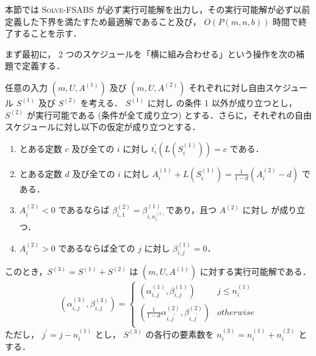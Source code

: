 本節では \textsc{Solve-FSABS} が必ず実行可能解を出力し，その実行可能解が必ず以前定義した下界を満たすため最適解であること及び， $O(P(m, n, b))$ 時間で終了することを示す．

まず最初に， 2 つのスケジュールを「横に組み合わせる」という操作を次の補題で定義する．

\begin{lemma}\label{lemma:horizontal-composition}
  任意の入力 $(m, U, A^{(1)})$ 及び $(m, U, A^{(2)})$ それぞれに対し自由スケジュール $S^{(1)}$ 及び $S^{(2)}$ を考える． $S^{(1)}$ に対し  の条件 1 以外が成り立つとし， $S^{(2)}$ が実行可能である (条件が全て成り立つ) とする．さらに，それぞれの自由スケジュールに対し以下の仮定が成り立つとする．
  \begin{enumerate}
  \item とある定数 $c$ 及び全ての $i$ に対し $t^\prime_i(L(S^{(1)}_i)) = c$ である． \label{hypothesis:same-arrival}
  \item とある定数 $d$ 及び全ての $i$ に対し $\displaystyle A^{(1)}_i + L(S^{(1)}_i) = \frac{1}{1-d}(A^{(2)}_i - d)$ である．
  \item $A^{(2)}_i < 0$ であるならば $\beta^{(2)}_{i,1} = \beta^{(1)}_{i,n_i^{(1)}}$であり，且つ $A^{(2)}$ に対し  が成り立つ． \label{hypothesis:same-bikes}
  \item $A^{(2)}_i > 0$ であるならば全ての $j$ に対し $\beta^{(1)}_{i,j} = 0$．\label{hypothesis:no-forward-bikes}
  \end{enumerate}
  このとき，$S^{(3)} = S^{(1)} + S^{(2)}$ は $(m, U, A^{(1)})$ に対する実行可能解である．
  \begin{equation}
    (\alpha^{(3)}_{i,j}, \beta^{(3)}_{i,j}) = \begin{cases}
      (\alpha^{(1)}_{i,j}, \beta^{(1)}_{i,j}) & j \leq n_i^{(1)} \\
      (\frac{1}{1 - d}\alpha^{(2)}_{i,j^\prime}, \beta^{(2)}_{i,j^\prime}) & otherwise \\
    \end{cases}
  \end{equation}
  ただし， $j^\prime = j - n_i^{(1)}$ とし， $S^{(3)}$ の各行の要素数を $n_i^{(3)} = n_i^{(1)} + n_i^{(2)}$ とする．
\end{lemma}
